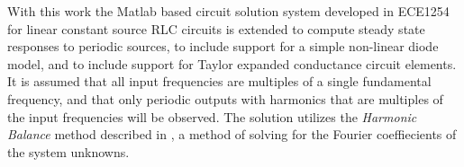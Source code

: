 %
%
With this work the Matlab based circuit solution system developed in ECE1254 for linear constant source RLC circuits is extended to compute steady state responses to periodic sources, to include support for a simple non-linear diode model, and to include support for Taylor expanded conductance circuit elements.
It is assumed that all input frequencies are multiples of a single fundamental frequency, and that only periodic outputs with harmonics that are multiples of the input frequencies will be observed.
The solution utilizes the \emph{Harmonic Balance} method described in \citep{giannini2004NonlinearMicrowaveCircuitDesign}, a method of solving for the Fourier coeffiecients of the system unknowns.
